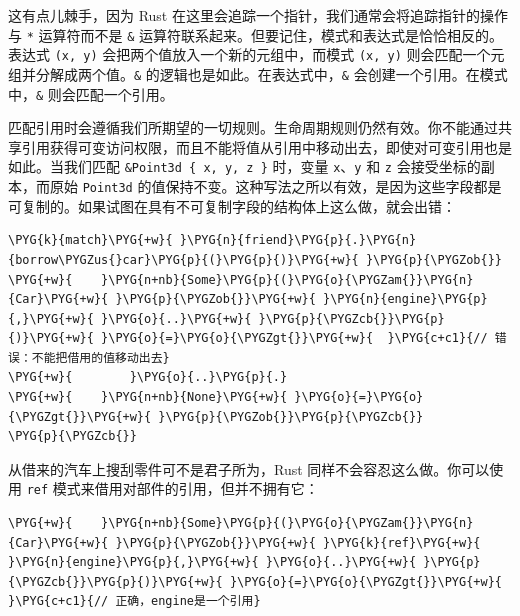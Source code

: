 
这有点儿棘手，因为 Rust 在这里会追踪一个指针，我们通常会将追踪指针的操作与 \texttt{*} 运算符而不是 \texttt{\&} 运算符联系起来。但要记住，模式和表达式是恰恰相反的。表达式 \texttt{(x, y)} 会把两个值放入一个新的元组中，而模式 \texttt{(x, y)} 则会匹配一个元组并分解成两个值。\texttt{\&} 的逻辑也是如此。在表达式中，\texttt{\&} 会创建一个引用。在模式中，\texttt{\&} 则会匹配一个引用。

匹配引用时会遵循我们所期望的一切规则。生命周期规则仍然有效。你不能通过共享引用获得可变访问权限，而且不能将值从引用中移动出去，即使对可变引用也是如此。当我们匹配 \texttt{\&Point3d \{ x, y, z \}} 时，变量 \texttt{x}、\texttt{y} 和 \texttt{z} 会接受坐标的副本，而原始 \texttt{Point3d} 的值保持不变。这种写法之所以有效，是因为这些字段都是可复制的。如果试图在具有不可复制字段的结构体上这么做，就会出错：

\begin{Verbatim}[commandchars=\\\{\},breaklines=true,breakanywhere=true,fontsize=\codefont,xleftmargin=17bp]
\PYG{k}{match}\PYG{+w}{ }\PYG{n}{friend}\PYG{p}{.}\PYG{n}{borrow\PYGZus{}car}\PYG{p}{(}\PYG{p}{)}\PYG{+w}{ }\PYG{p}{\PYGZob{}}
\PYG{+w}{    }\PYG{n+nb}{Some}\PYG{p}{(}\PYG{o}{\PYGZam{}}\PYG{n}{Car}\PYG{+w}{ }\PYG{p}{\PYGZob{}}\PYG{+w}{ }\PYG{n}{engine}\PYG{p}{,}\PYG{+w}{ }\PYG{o}{..}\PYG{+w}{ }\PYG{p}{\PYGZcb{}}\PYG{p}{)}\PYG{+w}{ }\PYG{o}{=}\PYG{o}{\PYGZgt{}}\PYG{+w}{  }\PYG{c+c1}{// 错误：不能把借用的值移动出去}
\PYG{+w}{        }\PYG{o}{..}\PYG{p}{.}
\PYG{+w}{    }\PYG{n+nb}{None}\PYG{+w}{ }\PYG{o}{=}\PYG{o}{\PYGZgt{}}\PYG{+w}{ }\PYG{p}{\PYGZob{}}\PYG{p}{\PYGZcb{}}
\PYG{p}{\PYGZcb{}}
\end{Verbatim}

从借来的汽车上搜刮零件可不是君子所为，Rust 同样不会容忍这么做。你可以使用 \texttt{ref} 模式来借用对部件的引用，但并不拥有它：

\begin{Verbatim}[commandchars=\\\{\},breaklines=true,breakanywhere=true,fontsize=\codefont,xleftmargin=17bp]
\PYG{+w}{    }\PYG{n+nb}{Some}\PYG{p}{(}\PYG{o}{\PYGZam{}}\PYG{n}{Car}\PYG{+w}{ }\PYG{p}{\PYGZob{}}\PYG{+w}{ }\PYG{k}{ref}\PYG{+w}{ }\PYG{n}{engine}\PYG{p}{,}\PYG{+w}{ }\PYG{o}{..}\PYG{+w}{ }\PYG{p}{\PYGZcb{}}\PYG{p}{)}\PYG{+w}{ }\PYG{o}{=}\PYG{o}{\PYGZgt{}}\PYG{+w}{  }\PYG{c+c1}{// 正确，engine是一个引用}
\end{Verbatim}

